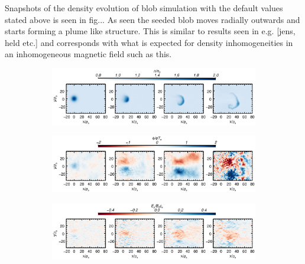 \documentclass[9pt,twocolumn]{article}
\renewcommand{\=}[1]{\stackrel{#1}{=}} %
\theoremstyle{definition}
\theoremstyle{remark}
\begin{document}
Snapshots of the density evolution of blob simulation with the default values stated above is seen in fig... As seen the seeded blob moves radially outwards and starts forming a plume like structure. This is similar to results seen in e.g. [jens, held etc.] and corresponds with what is expected for density inhomogeneities in an inhomogeneous magnetic field such as this. 

\begin{figure}
\begin{subfigure}{.99\textwidth}
  \includegraphics[trim=0mm 130mm 0mm 6mm,width=\textwidth]{Pictures/fourcontour.eps}
  \label{blob}
\end{subfigure}
\begin{subfigure}{.99\textwidth}
  \includegraphics[trim=0mm 130mm 0mm 6mm,width=\textwidth]{Pictures/threephitot.eps}
  \label{pot}
\end{subfigure}
\begin{subfigure}{.99\textwidth}
  \includegraphics[trim=0mm 130mm 0mm 6mm,width=\textwidth]{Pictures/eytot.eps}
  \label{efield}
\end{subfigure}
\end{figure}
\end{document}
